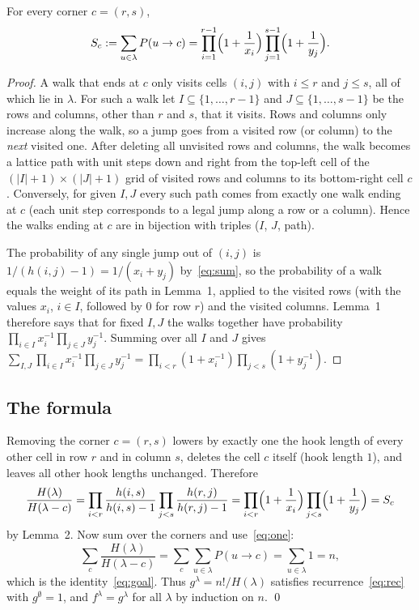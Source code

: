 \documentclass[11pt]{article}
\begin{document}
\begin{theorembox}[Lemma 2]
For every corner $c=(r,s)$,
\[
  S_c:=\sum_{u\in\lambda}P(u\to c)=\prod_{i=1}^{r-1}\Bigl(1+\frac1{x_i}\Bigr)\prod_{j=1}^{s-1}\Bigl(1+\frac1{y_j}\Bigr).
\]
\end{theorembox}
\begin{proof}
A walk that ends at $c$ only visits cells $(i,j)$ with $i\le r$ and $j\le s$, all of which lie in $\lambda$. For such a walk let $I\subseteq\{1,\dots,r-1\}$ and $J\subseteq\{1,\dots,s-1\}$ be the rows and columns,
other than $r$ and $s$, that it visits. Rows and columns only increase along the walk, so a jump goes from a visited row (or column) to the \emph{next} visited one.
After deleting all unvisited rows and columns, the walk becomes a lattice path with unit steps down and right from the top-left cell of the $(|I|+1)\times(|J|+1)$ grid of visited rows and columns to its bottom-right cell $c$.
Conversely, for given $I,J$ every such path comes from exactly one walk ending at $c$ (each unit step corresponds to a legal jump along a row or a column). Hence the walks ending at $c$ are in bijection with triples ($I$, $J$, path).

The probability of any single jump out of $(i,j)$ is $1/(h(i,j)-1)=1/(x_i+y_j)$ by~\eqref{eq:sum}, so the probability of a walk equals the weight of its path in Lemma~1, applied to the visited rows (with the values $x_i$, $i\in I$, followed by $0$ for row $r$) and the visited columns.
Lemma~1 therefore says that for fixed $I,J$ the walks together have probability $\prod_{i\in I}x_i^{-1}\prod_{j\in J}y_j^{-1}$. Summing over all $I$ and $J$ gives
$\sum_{I,J}\prod_{i\in I}x_i^{-1}\prod_{j\in J}y_j^{-1}=\prod_{i<r}(1+x_i^{-1})\prod_{j<s}(1+y_j^{-1})$.
\end{proof}

\subsection{The formula}
Removing the corner $c=(r,s)$ lowers by exactly one the hook length of every other cell in row $r$ and in column $s$, deletes the cell $c$ itself (hook length $1$), and leaves all other hook lengths unchanged. Therefore
\[
  \frac{H(\lambda)}{H(\lambda-c)}=\prod_{i<r}\frac{h(i,s)}{h(i,s)-1}\prod_{j<s}\frac{h(r,j)}{h(r,j)-1}
  =\prod_{i<r}\Bigl(1+\frac1{x_i}\Bigr)\prod_{j<s}\Bigl(1+\frac1{y_j}\Bigr)=S_c
\]
by Lemma~2. Now sum over the corners and use~\eqref{eq:one}:
\[
  \sum_c\frac{H(\lambda)}{H(\lambda-c)}=\sum_c\sum_{u\in\lambda}P(u\to c)=\sum_{u\in\lambda}1=n,
\]
which is the identity~\eqref{eq:goal}. Thus $g^\lambda=n!/H(\lambda)$ satisfies recurrence~\eqref{eq:rec} with $g^\emptyset=1$, and $f^\lambda=g^\lambda$ for all $\lambda$ by induction on $n$. \qed
\end{document}
